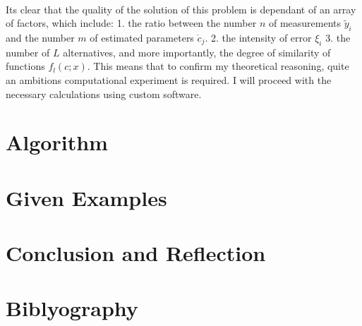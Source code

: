 \documentclass[11pt]{article}
\numberwithin{equation}{subsection}
\begin{document}
\\
Its clear that the quality of the solution of this problem is dependant of an array of factors, which include: 1. the ratio between the number $n$ of measurements $\tilde{y}_{i}$ and the number $m$ of estimated parameters $\dot{c}_{j}$. 2. the intensity of error $\xi_{i}$ 3. the number of $L$ alternatives, and more importantly, the degree of similarity of functions $f_{l}(c;x)$. This means that to confirm my theoretical reasoning, quite an ambitions computational experiment is required. I will proceed with the necessary calculations using custom software. 

\section{Algorithm}



\section{Given Examples}

\section{Conclusion and Reflection}
\newpage

\section*{Biblyography}
\end{document}
